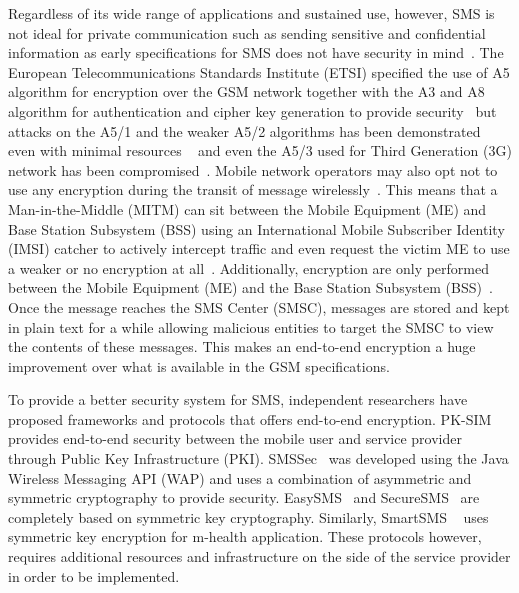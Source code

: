 \documentclass[journal]{./IEEE/IEEEtran}
\begin{document}
Regardless of its wide range of applications and sustained use, however, 
SMS is not ideal for private communication such as sending sensitive and 
confidential information as early specifications for SMS does not have security 
in mind~\cite{3gpp2}. The European Telecommunications Standards Institute (ETSI) 
specified the use of A5 algorithm for encryption over the GSM network together 
with the A3 and A8 algorithm for authentication and cipher key generation to 
provide security~\cite{Schiller2011} but attacks on the A5/1 and the weaker 
A5/2 algorithms has been demonstrated even with minimal resources
~\cite{a512001, a522007,Barkan_Biham_Keller_2003} and even the A5/3 used for 
Third Generation (3G) network has been compromised~\cite{a532010}. 
Mobile network operators may also opt not to use any encryption during the 
transit of message wirelessly~\cite{gsm348}. This means that a 
Man-in-the-Middle (MITM) can sit between the Mobile Equipment (ME) and 
Base Station Subsystem (BSS) using an International Mobile Subscriber Identity 
(IMSI) catcher to actively intercept traffic and even request the victim ME 
to use a weaker or no encryption at all~\cite{Cattaneo_DeMaio_Faruolo_Petrillo_2013}. 
Additionally, encryption are only performed between the Mobile Equipment (ME) 
and the Base Station Subsystem (BSS)~\cite{Schiller2011}. Once the message 
reaches the SMS Center (SMSC), messages are stored and kept in plain text for a 
while allowing malicious entities to target the SMSC to 
view the contents of these messages. This makes an end-to-end encryption a huge
improvement over what is available in the GSM specifications.

To provide a better security system for SMS, independent researchers have
proposed frameworks and protocols that offers end-to-end encryption.
PK-SIM~\cite{PKSIMcard07} provides end-to-end security between the mobile user 
and service provider through Public Key Infrastructure (PKI).
SMSSec~\cite{SMSSec08} was developed using the Java Wireless Messaging API (WAP)
and uses a combination of asymmetric and symmetric cryptography to provide
security. EasySMS~\cite{EasySMS14} and SecureSMS~\cite{SecureSMS14} are
completely based on symmetric key cryptography. Similarly, SmartSMS
~\cite{SmartSMS16} uses symmetric key encryption for m-health application.
These protocols however, requires additional resources and infrastructure
on the side of the service provider in order to be implemented.
\end{document}
